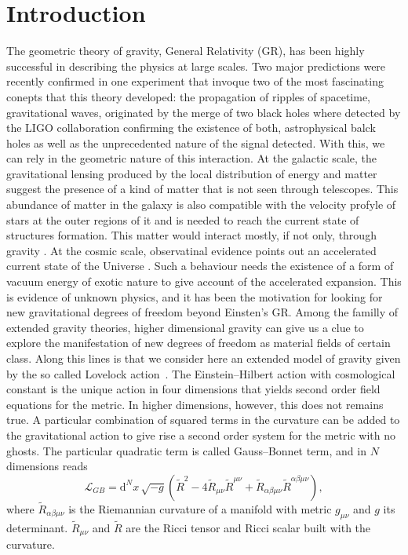 \documentclass[aps,prd,12pt,superscriptaddress,showpacs,showkeys,longbibliography,reprint]{revtex4-1}
\begin{document}
\section{Introduction}
The geometric theory of gravity, General Relativity (GR), has been highly successful in describing the physics at large scales. Two major predictions were recently confirmed in one experiment that invoque two of the most fascinating conepts that this theory developed: the propagation of ripples of spacetime, gravitational waves, originated by the merge of two black holes where detected by the LIGO collaboration \cite{Abbott:2016blz} confirming the existence of both, astrophysical balck holes as well as the unprecedented nature of the signal detected. With this, we can rely in the geometric nature of this interaction. At the galactic scale, the gravitational lensing produced by the local distribution of energy and matter suggest the presence of a kind of matter that is not seen through telescopes. This abundance of matter in the galaxy is also compatible with the velocity profyle of stars at the outer regions of it and is needed to reach the current state of structures formation. This matter would interact mostly, if not only, through gravity \cite{Sofue:2000jx}. At the cosmic scale, observatinal evidence points out an accelerated current state of the Universe \cite{Riess:1998cb}. Such a behaviour needs the existence of a form of vacuum energy of exotic nature to give account of the accelerated expansion. This is evidence of unknown physics, and it has been the motivation for looking for new gravitational degrees of freedom beyond Einsten's GR. Among the familly of extended gravity theories, higher dimensional gravity can give us a clue to explore the manifestation of new degrees of freedom as material fields of certain class. Along this lines is that we consider here an extended model of gravity given by the so called Lovelock action~\cite{Lovelock:1971yv}. 
The Einstein--Hilbert action with cosmological constant is the unique action in four dimensions that yields second order field equations for the metric. In higher dimensions, however, this does not remains true. A particular combination of squared terms in the curvature can be added to the gravitational action to give rise a second order system for the metric with no ghosts. The particular quadratic term is called Gauss--Bonnet term, and in $N$ dimensions reads
\begin{equation}\label{GB}
  \mathcal{L}_{GB}=\text{d}^N \!x \,\sqrt{-g}\left(\tilde{R}^2-4\tilde{R}_{\mu\nu}\tilde{R}^{\mu\nu}+\tilde{R}_{\alpha\beta\mu\nu}
  \tilde{R}^{\alpha\beta\mu\nu}\right),
\end{equation}
where $\tilde{R}_{\alpha\beta\mu\nu}$ is the Riemannian curvature of a manifold with metric $g_{\mu\nu}$ and $g$ its determinant. $\tilde{R}_{\mu\nu}$ and $\tilde{R}$ are the Ricci tensor and Ricci scalar built with the curvature.
\end{document}
